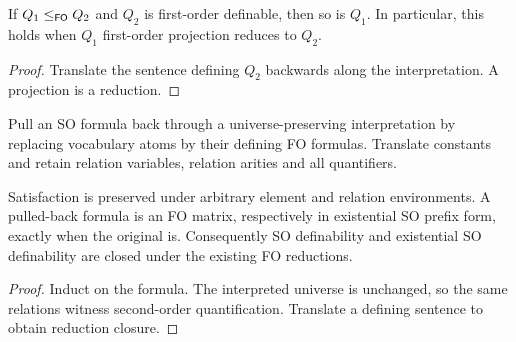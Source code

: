 \begin{theorem}
  \label{thm:desc-definable-reduction-closure}
  \leanok
  If $Q_1 \le_{\mathsf{FO}} Q_2$ and $Q_2$ is first-order definable, then so is $Q_1$.
  In particular, this holds when $Q_1$ first-order projection reduces to $Q_2$.
\end{theorem}
\begin{proof}
  \leanok
  Translate the sentence defining $Q_2$ backwards along the interpretation. A
  projection is a reduction.
\end{proof}

\begin{definition}
  \label{def:desc-so-pullback}
  \leanok
  Pull an SO formula back through a universe-preserving interpretation by
  replacing vocabulary atoms by their defining FO formulas. Translate constants
  and retain relation variables, relation arities and all quantifiers.
\end{definition}

\begin{theorem}
  \label{thm:desc-so-transport}
  \leanok
  Satisfaction is preserved under arbitrary element and relation environments.
  A pulled-back formula is an FO matrix, respectively in existential SO prefix
  form, exactly when the original is. Consequently SO definability and
  existential SO definability are closed under the existing FO reductions.
\end{theorem}
\begin{proof}
  \leanok
  Induct on the formula. The interpreted universe is unchanged, so the same
  relations witness second-order quantification. Translate a defining sentence
  to obtain reduction closure.
\end{proof}


